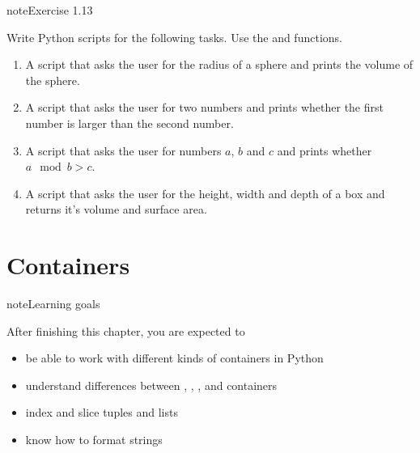 \documentclass[letterpaper,10pt,english]{jupyterBook}
\begin{document}
\begin{sphinxadmonition}{note}{Exercise 1.13}

\sphinxAtStartPar
Write Python scripts for  the following tasks. Use the  and  functions.
\begin{enumerate}
%
\item {} 
\sphinxAtStartPar
A script that asks the user for the radius of a sphere and prints the volume of the sphere.

\item {} 
\sphinxAtStartPar
A script that asks the user for two numbers and prints whether the first number is larger than the second number.

\item {} 
\sphinxAtStartPar
A script that asks the user for numbers \(a\), \(b\) and \(c\) and prints whether \(a\mod b > c\).

\item {} 
\sphinxAtStartPar
A script that asks the user for the height, width and depth of a box and returns it’s volume and surface area.

\end{enumerate}
\end{sphinxadmonition}

\sphinxstepscope


\chapter{Containers}
\label{\detokenize{notebooks/02_Containers/02_Containers_student:containers}}\label{\detokenize{notebooks/02_Containers/02_Containers_student::doc}}
\begin{sphinxadmonition}{note}{Learning goals}

\sphinxAtStartPar
After finishing this chapter, you are expected to
\begin{itemize}
\item {} 
\sphinxAtStartPar
be able to work with different kinds of containers in Python

\item {} 
\sphinxAtStartPar
understand differences between , , , and  containers

\item {} 
\sphinxAtStartPar
index and slice tuples and lists

\item {} 
\sphinxAtStartPar
know how to format strings

\end{itemize}
\end{sphinxadmonition}
\end{document}

